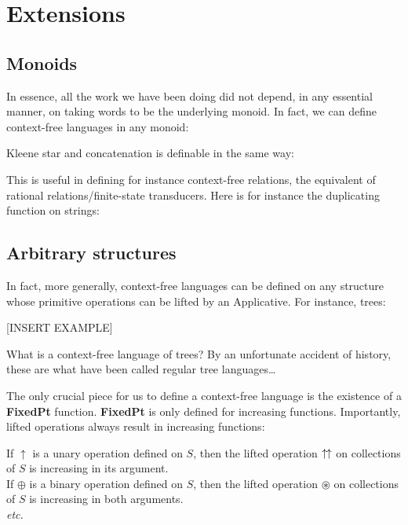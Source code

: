 \section{Extensions}

\subsection{Monoids}

In essence, all the work we have been doing did not depend, in any essential manner, on taking words to be the underlying monoid. In fact, we can define context-free languages in any monoid:



Kleene star and concatenation is definable in the same way:



This is useful in defining for instance context-free relations, the equivalent of rational relations/finite-state transducers. Here is for instance the duplicating function on strings:



\subsection{Arbitrary structures}

In fact, more generally, context-free languages can be defined on any structure whose primitive operations can be lifted by an Applicative. For instance, trees:

[INSERT EXAMPLE]

What is a context-free language of trees? By an unfortunate accident of history, these are what have been called regular tree languages\ldots

The only crucial piece for us to define a context-free language is the existence of a \textbf{FixedPt} function. \textbf{FixedPt} is only defined for increasing functions. Importantly, lifted operations always result in increasing functions:

\begin{prop}
If $\uparrow$ is a unary operation defined on $S$, then the lifted operation $\uparrow\hspace{-1pt}\uparrow$ on collections of $S$ is increasing in its argument.\\
If $\oplus$ is a binary operation defined on $S$, then the lifted operation $\circledast$ on collections of $S$ is increasing in both arguments.\\
\emph{etc.}
\end{prop}
%





